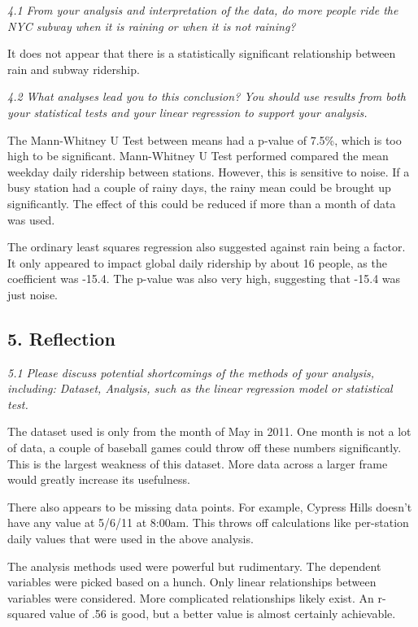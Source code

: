 \documentclass{article}
\begin{document}
    \emph{4.1 From your analysis and interpretation of the data, do more
people ride the NYC subway when it is raining or when it is not
raining?}

It does not appear that there is a statistically significant
relationship between rain and subway ridership.

\emph{4.2 What analyses lead you to this conclusion? You should use
results from both your statistical tests and your linear regression to
support your analysis.}

The Mann-Whitney U Test between means had a p-value of 7.5\%, which is
too high to be significant. Mann-Whitney U Test performed compared the
mean weekday daily ridership between stations. However, this is
sensitive to noise. If a busy station had a couple of rainy days, the
rainy mean could be brought up significantly. The effect of this could
be reduced if more than a month of data was used.

The ordinary least squares regression also suggested against rain being
a factor. It only appeared to impact global daily ridership by about 16
people, as the coefficient was -15.4. The p-value was also very high,
suggesting that -15.4 was just noise.

    \subsection*{5. Reflection}\label{reflection}

    \emph{5.1 Please discuss potential shortcomings of the methods of your
analysis, including: Dataset, Analysis, such as the linear regression
model or statistical test.}

The dataset used is only from the month of May in 2011. One month is not
a lot of data, a couple of baseball games could throw off these numbers
significantly. This is the largest weakness of this dataset. More data
across a larger frame would greatly increase its usefulness.

There also appears to be missing data points. For example, Cypress Hills
doesn't have any value at 5/6/11 at 8:00am. This throws off calculations
like per-station daily values that were used in the above analysis.

The analysis methods used were powerful but rudimentary. The dependent
variables were picked based on a hunch. Only linear relationships
between variables were considered. More complicated relationships likely
exist. An r-squared value of .56 is good, but a better value is almost
certainly achievable.


    
    
    
    
\end{document}
